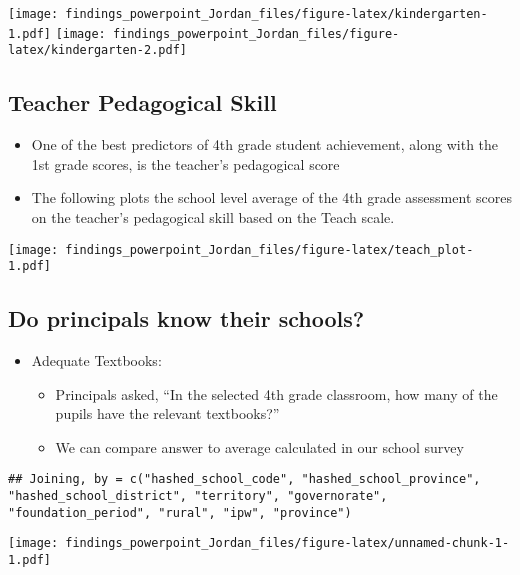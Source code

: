 \documentclass[
]{article}
\providecommand{\tightlist}{%
  \setlength{\itemsep}{0pt}\setlength{\parskip}{0pt}}
\begin{document}
\texttt{[image: findings\_powerpoint\_Jordan\_files/figure-latex/kindergarten-1.pdf]}
\texttt{[image: findings\_powerpoint\_Jordan\_files/figure-latex/kindergarten-2.pdf]}

\hypertarget{teacher-pedagogical-skill}{%
\subsection{Teacher Pedagogical Skill}\label{teacher-pedagogical-skill}}

\begin{itemize}
\tightlist
\item
  One of the best predictors of 4th grade student achievement, along
  with the 1st grade scores, is the teacher's pedagogical score\\
\item
  The following plots the school level average of the 4th grade
  assessment scores on the teacher's pedagogical skill based on the
  Teach scale.
\end{itemize}

\texttt{[image: findings\_powerpoint\_Jordan\_files/figure-latex/teach\_plot-1.pdf]}

\hypertarget{do-principals-know-their-schools}{%
\subsection{Do principals know their
schools?}\label{do-principals-know-their-schools}}

\begin{itemize}
\tightlist
\item
  Adequate Textbooks:

  \begin{itemize}
  \tightlist
  \item
    Principals asked, ``In the selected 4th grade classroom, how many of
    the pupils have the relevant textbooks?''
  \item
    We can compare answer to average calculated in our school survey
  \end{itemize}
\end{itemize}

\begin{verbatim}
## Joining, by = c("hashed_school_code", "hashed_school_province", "hashed_school_district", "territory", "governorate", "foundation_period", "rural", "ipw", "province")
\end{verbatim}

\texttt{[image: findings\_powerpoint\_Jordan\_files/figure-latex/unnamed-chunk-1-1.pdf]}
\end{document}
